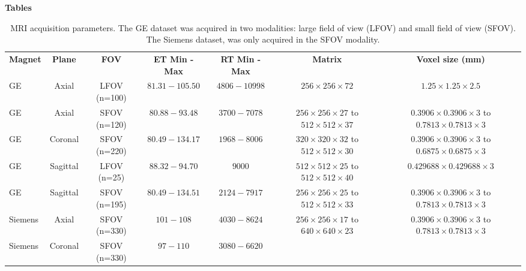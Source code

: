 \newpage
\textbf{Tables}
\begin{table}[ht]
    \caption{MRI acquisition parameters. The GE dataset was acquired in two modalities: large field of view (LFOV) and small field of view (SFOV). The Siemens dataset, was only acquired in the SFOV modality.}
    \begin{tabular}{lcccccc}
         \hline
          \textbf{Magnet} & \textbf{Plane} & \textbf{FOV} & \textbf{ET Min - Max} & \textbf{RT Min - Max} & \textbf{Matrix} & \textbf{Voxel size (mm)} \\
          GE & Axial & LFOV (n=100) & $81.31 - 105.50$ & $4806 - 10998$ & $256 \times 256 \times 72$ & $1.25 \times 1.25 \times 2.5$ \\
          GE & Axial & SFOV (n=120) & $80.88 - 93.48$ & $3700 -7078$ &
                \shortstack{ $256 \times 256 \times 27$ to\\ $512 \times 512 \times 37$} & 
                \shortstack{ $0.3906 \times 0.3906 \times 3$ to\\ $0.7813 \times 0.7813 \times 3$} \\
          GE & Coronal & SFOV (n=220) & $80.49 - 134.17$ & $1968 - 8006$ &  
                \shortstack{$320 \times 320 \times 32$ to \\  $512 \times 512 \times 30$} & 
                \shortstack{$0.3906 \times 0.3906 \times 3$ to \\ $0.6875 \times 0.6875 \times 3$}\\
          GE & Sagittal & LFOV (n=25) & $88.32 - 94.70$ & $9000$ & 
                \shortstack{$512 \times 512 \times 25$ to \\  $512 \times 512 \times 40$} & 
                $0.429688 \times 0.429688 \times 3$\\
          GE & Sagittal & SFOV (n=195) & $80.49 - 134.51$ & $2124 - 7917$&  
                \shortstack{ $256 \times 256 \times 25$ to \\ $512 \times 512 \times 33$} &
                \shortstack{$0.3906 \times 0.3906 \times 3$ to \\ $0.7813 \times 0.7813 \times 3$}\\
          Siemens & Axial & SFOV (n=330)  & $101 - 108$ & $4030 - 8624$&  
                \shortstack{$256  \times 256 \times 17$ to \\ $640 \times 640 \times 23$} & 
                \shortstack{$0.3906 \times 0.3906 \times 3$ to\\ $0.7813 \times 0.7813 \times 3$} \\
          Siemens & Coronal & SFOV (n=330) & $97 - 110$ & $3080 - 6620$&  

\end{tabular}
\end{table}
